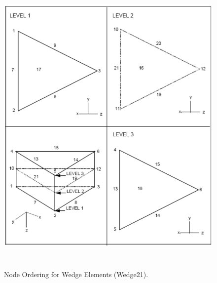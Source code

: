 \begin{figure}
\begin{center}
\includegraphics[width=6.000in, height=6.000in]{topology/wedge21.png}
\caption{Node Ordering for Wedge Elements (Wedge21).}\label{topology:wedge21}
\end{center}
\end{figure}

